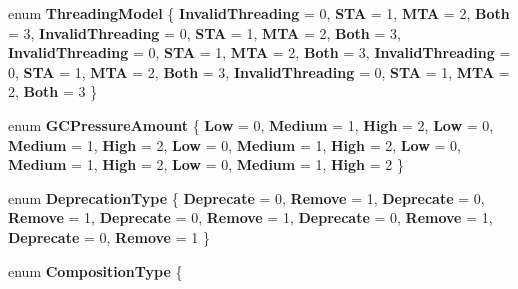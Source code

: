 \begin{DoxyCompactItemize}
enum {\bfseries Threading\+Model} \{ \newline
{\bfseries Invalid\+Threading} = 0, 
{\bfseries S\+TA} = 1, 
{\bfseries M\+TA} = 2, 
{\bfseries Both} = 3, 
\newline
{\bfseries Invalid\+Threading} = 0, 
{\bfseries S\+TA} = 1, 
{\bfseries M\+TA} = 2, 
{\bfseries Both} = 3, 
\newline
{\bfseries Invalid\+Threading} = 0, 
{\bfseries S\+TA} = 1, 
{\bfseries M\+TA} = 2, 
{\bfseries Both} = 3, 
\newline
{\bfseries Invalid\+Threading} = 0, 
{\bfseries S\+TA} = 1, 
{\bfseries M\+TA} = 2, 
{\bfseries Both} = 3, 
\newline
{\bfseries Invalid\+Threading} = 0, 
{\bfseries S\+TA} = 1, 
{\bfseries M\+TA} = 2, 
{\bfseries Both} = 3
 \}
\item 
\mbox{\label{namespace_windows_1_1_foundation_1_1_metadata_a877de1cc5a89f9df6ace56ccf9883aa4}} 
enum {\bfseries G\+C\+Pressure\+Amount} \{ \newline
{\bfseries Low} = 0, 
{\bfseries Medium} = 1, 
{\bfseries High} = 2, 
{\bfseries Low} = 0, 
\newline
{\bfseries Medium} = 1, 
{\bfseries High} = 2, 
{\bfseries Low} = 0, 
{\bfseries Medium} = 1, 
\newline
{\bfseries High} = 2, 
{\bfseries Low} = 0, 
{\bfseries Medium} = 1, 
{\bfseries High} = 2, 
\newline
{\bfseries Low} = 0, 
{\bfseries Medium} = 1, 
{\bfseries High} = 2
 \}
\item 
\mbox{\label{namespace_windows_1_1_foundation_1_1_metadata_a6012664166c4aca6e08f2f623e42d611}} 
enum {\bfseries Deprecation\+Type} \{ \newline
{\bfseries Deprecate} = 0, 
{\bfseries Remove} = 1, 
{\bfseries Deprecate} = 0, 
{\bfseries Remove} = 1, 
\newline
{\bfseries Deprecate} = 0, 
{\bfseries Remove} = 1, 
{\bfseries Deprecate} = 0, 
{\bfseries Remove} = 1, 
\newline
{\bfseries Deprecate} = 0, 
{\bfseries Remove} = 1
 \}
\item 
\mbox{\label{namespace_windows_1_1_foundation_1_1_metadata_a505a6f2bc4b2b9794234c3c04a49dab7}} 
enum {\bfseries Composition\+Type} \{ \newline

\end{DoxyCompactItemize}
